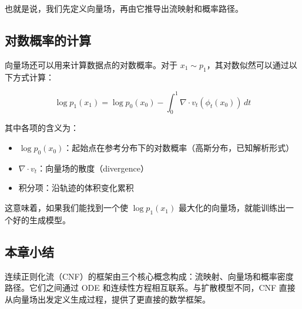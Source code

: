 也就是说，我们先定义向量场，再由它推导出流映射和概率路径。

\subsection{对数概率的计算}

向量场还可以用来计算数据点的对数概率。对于 $x_1 \sim p_1$，其对数似然可以通过以下方式计算：

$$\log p_1(x_1) = \log p_0(x_0) - \int_0^1 \nabla \cdot v_t(\phi_t(x_0)) \, dt$$

其中各项的含义为：
\begin{itemize}
    \item $\log p_0(x_0)$：起始点在参考分布下的对数概率（高斯分布，已知解析形式）
    \item $\nabla \cdot v_t$：向量场的散度（divergence）
    \item 积分项：沿轨迹的体积变化累积
\end{itemize}

这意味着，如果我们能找到一个使 $\log p_1(x_1)$ 最大化的向量场，就能训练出一个好的生成模型。

\subsection{本章小结}

连续正则化流（CNF）的框架由三个核心概念构成：流映射、向量场和概率密度路径。它们之间通过 ODE 和连续性方程相互联系。与扩散模型不同，CNF 直接从向量场出发定义生成过程，提供了更直接的数学框架。

